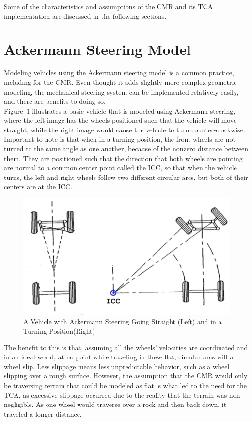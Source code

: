 Some of the characteristics and assumptions of the \ac{CMR} and its \ac{TCA} implementation are discussed in the following sections.

\section{Ackermann Steering Model}
Modeling vehicles using the Ackermann steering model is a common practice, including for the \ac{CMR}. Even thought it adds slightly more complex geometric modeling, the mechanical steering system can be implemented relatively easily, and there are benefits to doing so. \\

Figure~\ref{traction_control:algorithms:ackermann-steering} illustrates a basic vehicle that is modeled using Ackermann steering, where the left image has the wheels positioned such that the vehicle will move straight, while the right image would cause the vehicle to turn counter-clockwise. Important to note is that when in a turning position, the front wheels are not turned to the same angle as one another, because of the nonzero distance between them. They are positioned such that the direction that both wheels are pointing are normal to a common center point called the \ac{ICC}, so that when the vehicle turns, the left and right wheels follow two different circular arcs, but both of their centers are at the \ac{ICC}.

\begin{figure}[H]
	\centering
	\includegraphics[width=.9\textwidth]{sections/algorithms/images/ackermann_steering.png}
	\caption{A Vehicle with Ackermann Steering Going Straight (Left) and in a Turning Position(Right)}
	\label{traction_control:algorithms:ackermann-steering}
\end{figure}

The benefit to this is that, assuming all the wheels' velocities are coordinated and in an ideal world, at no point while traveling in these flat, circular arcs will a wheel slip. Less slippage means less unpredictable behavior, such as a wheel slipping over a rough surface. However, the assumption that the \ac{CMR} would only be traversing terrain that could be modeled as flat is what led to the need for the \ac{TCA}, as excessive slippage occurred due to the reality that the terrain was non-negligible. As one wheel would traverse over a rock and then back down, it traveled a longer distance. \\

